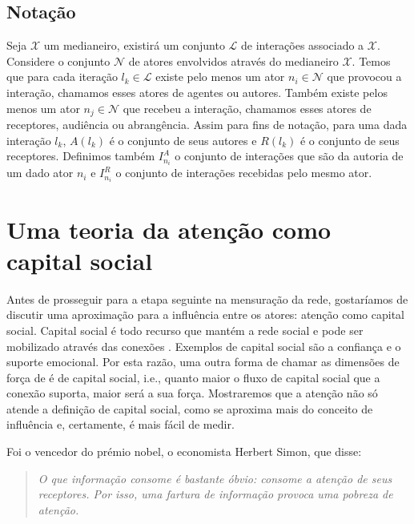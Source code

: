 \subsection{Notação}

Seja $\mathscr{X}$ um medianeiro, existirá um conjunto $\mathscr{L}$ de
interações associado a $\mathscr{X}$. Considere o conjunto $\mathscr{N}$ de
atores envolvidos através do medianeiro $\mathscr{X}$. Temos que para cada
iteração $l_k \in \mathscr{L}$ existe pelo menos um ator $n_i \in \mathscr{N}$
que provocou a interação, chamamos esses atores de agentes ou autores. Também
existe pelos menos um ator $n_j \in \mathscr{N}$ que recebeu a interação,
chamamos esses atores de receptores, audiência ou abrangência. Assim para fins de
notação, para uma dada interação $l_k$, $A(l_k)$ é o conjunto de seus autores e
$R(l_k)$ é o conjunto de seus receptores. Definimos também $I^A_{n_i}$ o
conjunto de interações que são da autoria de um dado ator $n_i$ e $I^R_{n_i}$ o
conjunto de interações recebidas pelo mesmo ator.

\section{Uma teoria da atenção como capital social}
\label{sec:teoria_atencao}

Antes de prosseguir para a etapa seguinte na mensuração da rede, gostaríamos de
discutir uma aproximação para a influência entre os atores: atenção como capital
social. Capital social é todo recurso que mantém a rede social
\citep{Coleman1988} e pode ser mobilizado através das conexões
\citep{Gyarmati2004}. Exemplos de capital social são a confiança e o suporte
emocional. Por esta razão, uma outra forma de chamar as dimensões de força de
\citeauthor{Granovetter1973} é de capital social, i.e., quanto maior o fluxo de
capital social que a conexão suporta, maior será a sua força. Mostraremos que a
atenção não só atende a definição de capital social, como se aproxima mais do
conceito de influência e, certamente, é mais fácil de medir.

Foi o vencedor do prémio nobel, o economista Herbert Simon, que disse:

\begin{quote}{\citep{Simon1996}}\emph{O que informação consome é bastante óbvio:
consome a atenção de seus receptores. Por isso, uma fartura de informação
provoca uma pobreza de atenção.}
\end{quote}

